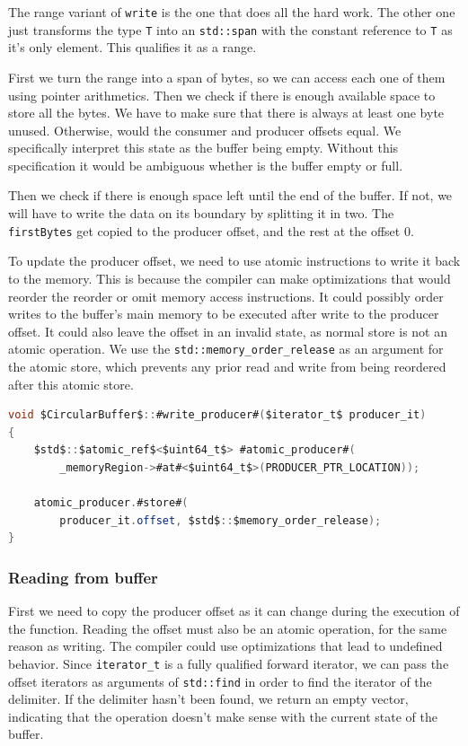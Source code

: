The range variant of \texttt{write} is the one that does all the hard work. The other one just transforms the type \texttt{T} into an \texttt{std::span} with the constant reference to \texttt{T} as it's only element. This qualifies it as a range.

First we turn the range into a span of bytes, so we can access each one of them using pointer arithmetics. Then we check if there is enough available space to store all the bytes. We have to make sure that there is always at least one byte unused. Otherwise, would the consumer and producer offsets equal. We specifically interpret this state as the buffer being empty. Without this specification it would be ambiguous whether is the buffer empty or full.

Then we check if there is enough space left until the end of the buffer. If not, we will have to write the data on its boundary by splitting it in two. The \texttt{firstBytes} get copied to the producer offset, and the rest at the offset 0.

To update the producer offset, we need to use atomic instructions to write it back to the memory. This is because the compiler can make optimizations that would reorder the reorder or omit memory access instructions. It could possibly order writes to the buffer's main memory to be executed after write to the producer offset. It could also leave the offset in an invalid state, as normal store is not an atomic operation. We use the \texttt{std::memory\_order\_release} as an argument for the atomic store, which prevents any prior read and write from being reordered after this atomic store.

\begin{lstlisting}[language=csharp, caption={\texttt{write\_producer} method}]
void $CircularBuffer$::#write_producer#($iterator_t$ producer_it)
{
    $std$::$atomic_ref$<$uint64_t$> #atomic_producer#(
        _memoryRegion->#at#<$uint64_t$>(PRODUCER_PTR_LOCATION));

    atomic_producer.#store#(
        producer_it.offset, $std$::$memory_order_release);
}
\end{lstlisting}

\subsubsection{Reading from buffer}

First we need to copy the producer offset as it can change during the execution of the function. Reading the offset must also be an atomic operation, for the same reason as writing. The compiler could use optimizations that lead to undefined behavior. Since \texttt{iterator\_t} is a fully qualified forward iterator, we can pass the offset iterators as arguments of \texttt{std::find} in order to find the iterator of the delimiter. If the delimiter hasn't been found, we return an empty vector, indicating that the operation doesn't make sense with the current state of the buffer.


